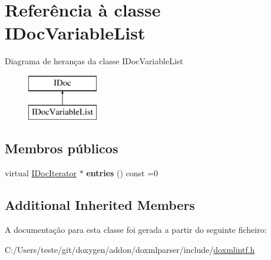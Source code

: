 \hypertarget{class_i_doc_variable_list}{\section{Referência à classe I\-Doc\-Variable\-List}
\label{class_i_doc_variable_list}
}
Diagrama de heranças da classe I\-Doc\-Variable\-List\begin{figure}[H]
\begin{center}
\leavevmode
\includegraphics[height=2.000000cm]{class_i_doc_variable_list}
\end{center}
\end{figure}
\subsection*{Membros públicos}
\begin{DoxyCompactItemize}
\item 
\hypertarget{class_i_doc_variable_list_a891aa4ad580c8eee95af66338c4d7c14}{virtual \hyperlink{class_i_doc_iterator}{I\-Doc\-Iterator} $\ast$ {\bfseries entries} () const =0}\label{class_i_doc_variable_list_a891aa4ad580c8eee95af66338c4d7c14}

\end{DoxyCompactItemize}
\subsection*{Additional Inherited Members}


A documentação para esta classe foi gerada a partir do seguinte ficheiro\-:\begin{DoxyCompactItemize}
\item 
C\-:/\-Users/teste/git/doxygen/addon/doxmlparser/include/\hyperlink{include_2doxmlintf_8h}{doxmlintf.\-h}\end{DoxyCompactItemize}
